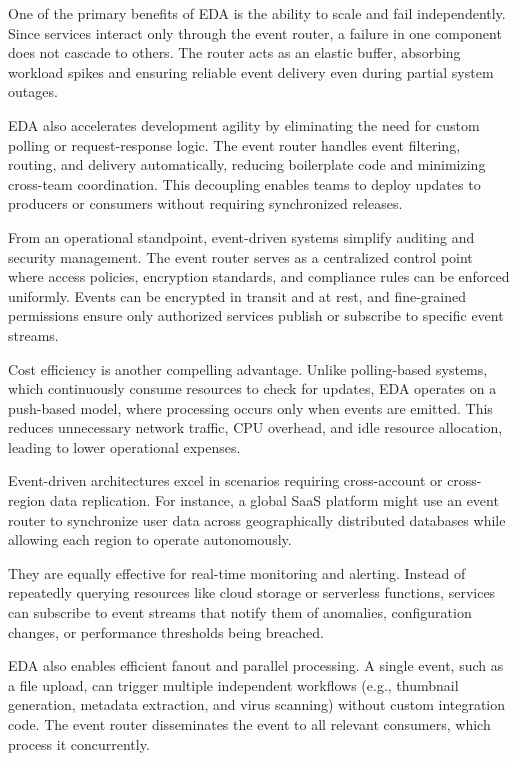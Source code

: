 \documentclass[]{final}
\begin{document}
One of the primary benefits of EDA is the ability to scale and fail
independently. Since services interact only through the event router, a failure
in one component does not cascade to others. The router acts as an elastic
buffer, absorbing workload spikes and ensuring reliable event delivery even
during partial system outages.

EDA also accelerates development agility by eliminating the need for custom
polling or request-response logic. The event router handles event filtering,
routing, and delivery automatically, reducing boilerplate code and minimizing
cross-team coordination. This decoupling enables teams to deploy updates to
producers or consumers without requiring synchronized releases.

From an operational standpoint, event-driven systems simplify auditing and
security management. The event router serves as a centralized control point
where access policies, encryption standards, and compliance rules can be
enforced uniformly. Events can be encrypted in transit and at rest, and
fine-grained permissions ensure only authorized services publish or subscribe
to specific event streams.

Cost efficiency is another compelling advantage. Unlike polling-based systems,
which continuously consume resources to check for updates, EDA operates on a
push-based model, where processing occurs only when events are emitted. This
reduces unnecessary network traffic, CPU overhead, and idle resource allocation,
leading to lower operational expenses.

Event-driven architectures excel in scenarios requiring cross-account or
cross-region data replication. For instance, a global SaaS platform might use
an event router to synchronize user data across geographically distributed
databases while allowing each region to operate autonomously.

They are equally effective for real-time monitoring and alerting. Instead of
repeatedly querying resources like cloud storage or serverless functions,
services can subscribe to event streams that notify them of anomalies,
configuration changes, or performance thresholds being breached.

EDA also enables efficient fanout and parallel processing. A single event,
such as a file upload, can trigger multiple independent workflows (e.g.,
thumbnail generation, metadata extraction, and virus scanning) without custom
integration code. The event router disseminates the event to all relevant
consumers, which process it concurrently.
\end{document}
